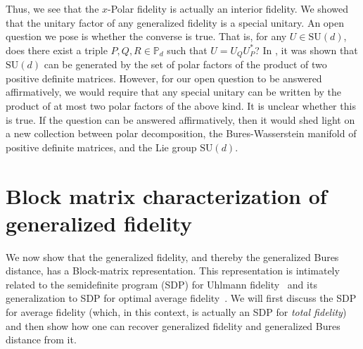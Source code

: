\documentclass[12pt]{article}
\theoremstyle{definition}
\begin{document}
Thus, we see that the $x$-Polar fidelity is actually an interior fidelity. We showed that the unitary factor of any generalized fidelity is a special unitary. An open question we pose is whether the converse is true. That is, for any $U \in \mathrm{SU}(d)$, does there exist a triple $P,Q,R \in \mathbb P_d$ such that $U = U_Q U_P^*$? In \cite[Remark 5.2]{lawson2008gamma}, it was shown that $\mathrm{SU}(d)$ can be generated by the set of polar factors of the product of two positive definite matrices. However, for our open question to be answered affirmatively, we would require that any special unitary can be written by the product of at most two polar factors of the above kind. It is unclear whether this is true. If the question can be answered affirmatively, then it would shed light on a new collection between polar decomposition, the Bures-Wasserstein manifold of positive definite matrices, and the Lie group $\mathrm{SU}(d)$. 






\section{Block matrix characterization of generalized fidelity } \label{Sec:BlockMatrix}

We now show that the generalized fidelity, and thereby the generalized Bures distance, has a Block-matrix representation. This representation is intimately related to the semidefinite program (SDP) for Uhlmann fidelity~\cite{watrous2018theory} and its generalization to SDP for optimal average fidelity~\cite{afham2022}. We will first discuss the SDP for average fidelity (which, in this context, is actually an SDP for \textit{total fidelity}) and then show how one can recover generalized fidelity and generalized Bures distance from it. 
\end{document}
